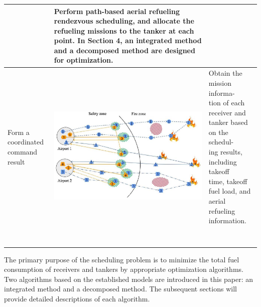 \begin{table}
\begin{centering}
\begin{tabular}{p{2.4cm}|p{9.3cm}|p{3.4cm}}
			&
			Perform path-based aerial refueling rendezvous scheduling, and allocate the refueling missions to the tanker at each point. In Section 4, an integrated method and a decomposed method are designed for optimization.\tabularnewline
			\hline
			\tabincell{l}{Form a coordinated\\ command result\\\\\\}&\begin{adjustbox}{raise=-0.4\height}\includegraphics{Figures/Figs_Ch16/p4.pdf}\end{adjustbox}
			&
			\tabincell{l}{Obtain the mission informa-\\tion of each receiver and \\tanker based on the schedul-\\ing results, including takeoff\\ time, takeoff fuel load, and\\ aerial refueling information.\\\\\\}\tabularnewline                                    
			\hline 
		\end{tabular}
		\par\end{centering}
	\centering{}
	\label{Tab_15.2}
\end{table}

The primary purpose of the scheduling problem is to minimize the total fuel consumption of receivers and tankers by appropriate optimization algorithms. Two algorithms based on the established models are introduced in this paper: an integrated method and a decomposed method. The subsequent sections will provide detailed descriptions of each algorithm.

